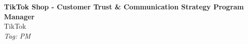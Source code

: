 \documentclass[11pt]{article}
\begin{document}
\begin{center}
  {\LARGE \textbf{TikTok Shop - Customer Trust \& Communication Strategy Program Manager}} \\[4pt]
  {\large TikTok} \\[2pt]
  {\small \textit{Tag: PM}}
\end{center}

\vspace{1em}
\noindent
\end{document}

